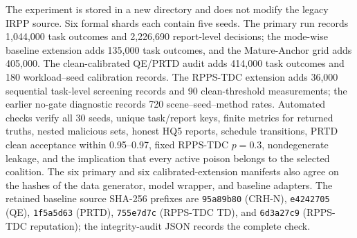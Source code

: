 \documentclass[journal]{IEEEtran}
\begin{document}
The experiment is stored in a new directory and does not modify the legacy
IRPP source. Six formal shards each contain five seeds. The primary run records
1,044,000 task outcomes and 2,226,690 report-level decisions; the mode-wise
baseline extension adds 135,000 task outcomes, and the Mature-Anchor grid adds
405,000. The clean-calibrated QE/PRTD audit adds 414,000 task outcomes and
180 workload--seed calibration records. The RPPS-TDC extension adds 36,000
sequential task-level screening records and 90 clean-threshold measurements;
the earlier no-gate diagnostic records 720 scene--seed--method rates.
Automated checks verify all
30 seeds, unique task/report keys, finite metrics for returned truths, nested
malicious sets, honest HQ5 reports, schedule transitions, PRTD clean acceptance
within 0.95--0.97, fixed RPPS-TDC $p=0.3$, nondegenerate leakage, and the implication that
every active poison belongs to the selected coalition. The six primary and six
calibrated-extension manifests also agree on the hashes of the data generator,
model wrapper, and baseline adapters. The retained baseline source SHA-256 prefixes are
\texttt{95a89b80} (CRH-N), \texttt{e4242705} (QE), \texttt{1f5a5d63}
(PRTD), \texttt{755e7d7c} (RPPS-TDC TD), and \texttt{6d3a27c9}
(RPPS-TDC reputation); the integrity-audit JSON records the complete check.
\end{document}
